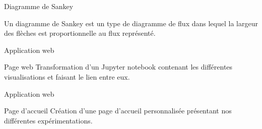 \documentclass[10pt,handout]{beamer}
\newif\ifplacelogo %
\begin{document}
\begin{frame}{Diagramme de Sankey}
    \begin{block}{}
        Un diagramme de Sankey est un type de diagramme de flux dans lequel la largeur des flèches
        est proportionnelle au flux représenté.
    \end{block}
\end{frame}
\placelogofalse
\begin{frame}{Application web}
    \begin{block}{Page web}
        Transformation d'un Jupyter notebook contenant les différentes visualisations et faisant le lien entre eux.
    \end{block}
\end{frame}

\begin{frame}{Application web}
    \begin{block}{Page d'accueil}
        Création d'une page d'accueil personnalisée présentant nos différentes expérimentations.
    \end{block}
\end{frame}
\placelogotrue
\end{document}
